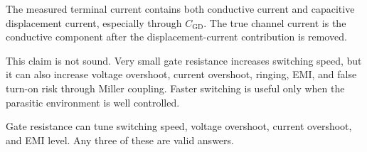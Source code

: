 \begin{solutionblock}
The measured terminal current contains both conductive current and capacitive displacement current, especially through $C_\mathrm{GD}$. The true channel current is the conductive component after the displacement-current contribution is removed.
\end{solutionblock}

\begin{solutionblock}
This claim is not sound. Very small gate resistance increases switching speed, but it can also increase voltage overshoot, current overshoot, ringing, EMI, and false turn-on risk through Miller coupling. Faster switching is useful only when the parasitic environment is well controlled.
\end{solutionblock}

\begin{solutionblock}
Gate resistance can tune switching speed, voltage overshoot, current overshoot, and EMI level. Any three of these are valid answers.
\end{solutionblock}

